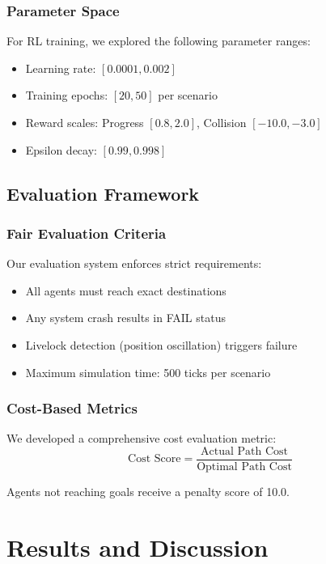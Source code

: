 \documentclass[12pt, a4paper]{report}
\begin{document}
\subsection{Parameter Space}
For RL training, we explored the following parameter ranges:
\begin{itemize}
    \item Learning rate: $[0.0001, 0.002]$
    \item Training epochs: $[20, 50]$ per scenario
    \item Reward scales: Progress $[0.8, 2.0]$, Collision $[-10.0, -3.0]$
    \item Epsilon decay: $[0.99, 0.998]$
\end{itemize}

\section{Evaluation Framework}

\subsection{Fair Evaluation Criteria}
Our evaluation system enforces strict requirements:
\begin{itemize}
    \item All agents must reach exact destinations
    \item Any system crash results in FAIL status
    \item Livelock detection (position oscillation) triggers failure
    \item Maximum simulation time: 500 ticks per scenario
\end{itemize}

\subsection{Cost-Based Metrics}
We developed a comprehensive cost evaluation metric:
\begin{equation}
\text{Cost Score} = \frac{\text{Actual Path Cost}}{\text{Optimal Path Cost}}
\end{equation}

Agents not reaching goals receive a penalty score of 10.0.

\chapter{Results and Discussion}
\end{document}
